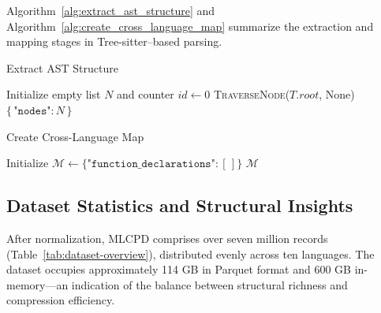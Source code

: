\documentclass{article}
\begin{document}
Algorithm~\ref{alg:extract_ast_structure} and Algorithm~\ref{alg:create_cross_language_map} summarize the extraction and mapping stages in Tree-sitter–based parsing.

\begin{algorithm}[H]
\caption{Extract AST Structure}
\label{alg:extract_ast_structure}
\DontPrintSemicolon
{}
Initialize empty list $N$ and counter $id \leftarrow 0$\;
\textsc{TraverseNode}($T.root$, None)\;
\Return $\{\,\texttt{"nodes"}: N\,\}$\;
\end{algorithm}

\begin{algorithm}[H]
\caption{Create Cross-Language Map}
\label{alg:create_cross_language_map}
\DontPrintSemicolon
{}
Initialize $\mathcal{M} \gets \{\texttt{"function\_declarations"} : [\,]\}$\;
\Return $\mathcal{M}$\;
\end{algorithm}

\subsection{Dataset Statistics and Structural Insights}
After normalization, MLCPD comprises over seven million records (Table~\ref{tab:dataset-overview}), distributed evenly across ten languages. The dataset occupies approximately 114 GB in Parquet format and 600 GB in-memory—an indication of the balance between structural richness and compression efficiency.
\end{document}
